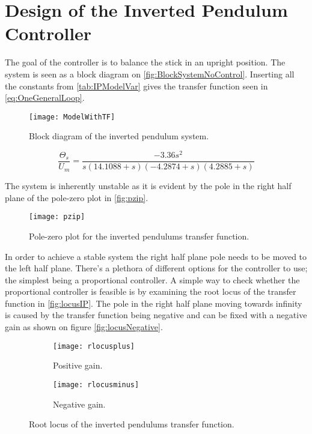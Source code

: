 \graphicspath{{figures/Design/IPController/}}
\chapter{Design of the Inverted Pendulum Controller}\label{sec:IPController}

The goal of the controller is to balance the stick in an upright position. The system is seen as a block diagram on \autoref{fig:BlockSystemNoControl}. Inserting all the constants from \autoref{tab:IPModelVar} gives the transfer function seen in \autoref{eq:OneGeneralLoop}.
\begin{figure}[htbp]
\centering
\texttt{[image: ModelWithTF]}
\caption{Block diagram of the inverted pendulum system.}
\label{fig:BlockSystemNoControl}
\end{figure}

\begin{equation}\label{eq:OneGeneralLoop}
\frac{\Theta_s}{U_m}=\frac{-3.36 s^2}{s (14.1088+s)(-4.2874+s)(4.2885+s)} %
\end{equation}

The system is inherently unstable as it is evident by the pole in the right half plane of the pole-zero plot in \autoref{fig:pzip}.
\begin{figure}[htbp]
\centering
\texttt{[image: pzip]}
\caption{Pole-zero plot for the inverted pendulums transfer function.}
\label{fig:pzip}
\end{figure}

In order to achieve a stable system the right half plane pole needs to be moved to the left half plane.
\newpage
There's a plethora of different options for the controller to use; the simplest being a proportional controller. A simple way to check whether the proportional controller is feasible is by examining the root locus of the transfer function in \autoref{fig:locusIP}. The pole in the right half plane moving towards infinity is caused by the transfer function being negative and can be fixed with a negative gain as shown on figure \autoref{fig:locusNegative}.
\begin{figure}[htbp]
\centering
	\begin{subfigure}{0.45\textwidth}
	\texttt{[image: rlocusplus]}
	\caption{Positive gain.}
	\label{fig:locusIP}
	\end{subfigure}
	\begin{subfigure}{0.45\textwidth}
	\centering
	\texttt{[image: rlocusminus]}
	\caption{Negative gain.}
	\label{fig:locusNegative}
	\end{subfigure}
\caption{Root locus of the inverted pendulums transfer function.}
\end{figure}

